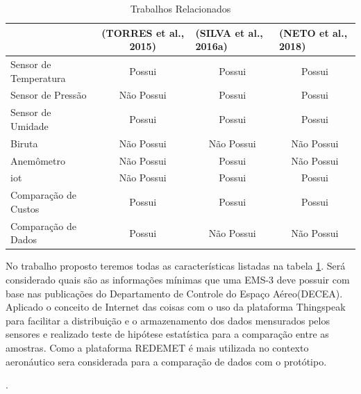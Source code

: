 \begin{table}[!h]
\centering
\begin{tabular}{|l|c|c|c|}
\hline
                      & \textbf{(TORRES et al., 2015)} & \multicolumn{1}{l|}{\textbf{(SILVA et al., 2016a)}} & \multicolumn{1}{l|}{\textbf{(NETO et al., 2018)}} \\ \hline
Sensor de Temperatura & Possui                         & Possui                                              & Possui                                            \\ \hline
Sensor de Pressão     & Não Possui                     & Possui                                              & Possui                                            \\ \hline
Sensor de Umidade     & Possui                         & Possui                                              & Possui                                            \\ \hline
Biruta                & Não Possui                     & Não Possui                                          & Não Possui                                        \\ \hline
Anemômetro            & Não Possui                     & Possui                                              & Não Possui                                        \\ \hline
iot                   & Não Possui                     & Possui                                              & Possui                                            \\ \hline
Comparação de Custos  & Possui                         & Possui                                              & Possui                                            \\ \hline
Comparação de Dados   & Possui                         & Não Possui                                          & Não Possui                                        \\ \hline
\end{tabular}
\caption{Trabalhos Relacionados}
\label{tab:comp_trabalhos}
\end{table}


No trabalho proposto teremos todas as características listadas na tabela \ref{tab:comp_trabalhos}. Será considerado quais são as informações mínimas que uma EMS-3 deve possuir com base nas publicações do Departamento de Controle do Espaço Aéreo(DECEA). Aplicado o conceito de Internet das coisas com o uso da plataforma Thingspeak para facilitar a distribuição e o armazenamento dos dados mensurados pelos sensores e realizado teste de hipótese estatística para a comparação entre as amostras. Como a plataforma REDEMET é mais utilizada no contexto aeronáutico sera considerada para a comparação de dados com o protótipo.







.


